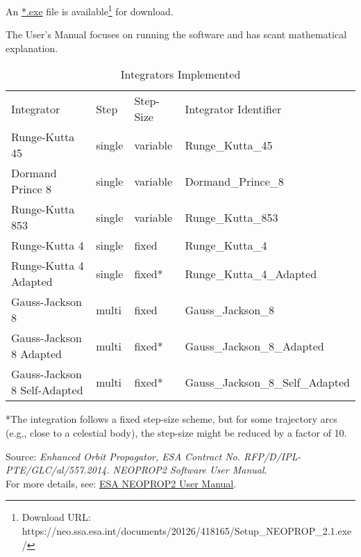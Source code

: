 An \href{https://neo.ssa.esa.int/documents/20126/418165/Setup\_NEOPROP\_2.1.exe/}{*.exe} file is available\footnote{Download URL: https://neo.ssa.esa.int/documents/20126/418165/Setup\_NEOPROP\_2.1.exe/} for download.

The User's Manual focuses on running the software and has scant mathematical explanation.


\begin{table}[!htbp]
\centering
\caption{Integrators Implemented}
\begin{tabular}{llll}
Integrator             & Step & Step-Size   & Integrator Identifier \\
Runge-Kutta 45         & single            & variable    & Runge\_Kutta\_45      \\
Dormand Prince 8       & single            & variable    & Dormand\_Prince\_8    \\
Runge-Kutta 853        & single            & variable    & Runge\_Kutta\_853     \\
Runge-Kutta 4          & single            & fixed       & Runge\_Kutta\_4       \\
Runge-Kutta 4 Adapted  & single            & fixed*      & Runge\_Kutta\_4\_Adapted \\
Gauss-Jackson 8        & multi             & fixed       & Gauss\_Jackson\_8     \\
Gauss-Jackson 8 Adapted & multi            & fixed*      & Gauss\_Jackson\_8\_Adapted \\
Gauss-Jackson 8 Self-Adapted & multi      & fixed*      & Gauss\_Jackson\_8\_Self\_Adapted \\
\end{tabular}

\begin{flushleft}
*The integration follows a fixed step-size scheme, but for some trajectory arcs (e.g., close to a celestial body), the step-size might be reduced by a factor of 10.

Source: \textit{Enhanced Orbit Propagator, ESA Contract No. RFP/D/IPL-PTE/GLC/al/557.2014. NEOPROP2 Software User Manual}.\\
For more details, see: \href{https://neo.ssa.esa.int/documents/20126/418165/propagator-manual.pdf/8e36ff2a-f499-a031-77bb-0bf917810d97?t=1559724493027#page=42}{ESA NEOPROP2 User Manual}.
\end{flushleft}
\end{table}

